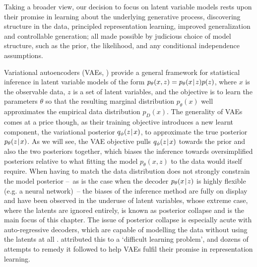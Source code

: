 Taking a broader view, our decision to focus on latent variable models rests upon their promise in learning about the underlying generative process, discovering structure in the data, principled representation learning, improved generalization and controllable generation; all made possible by judicious choice of model structure, such as the prior, the likelihood, and any conditional independence assumptions.

Variational autoencoders (VAEs, \citealp{kingma2013auto,rezende2014stochastic}) provide a general framework for statistical inference in latent variable models of the form $p_\theta(x,z)=p_\theta(x\hspace{0.08em}|\hspace{0.11em} z)p(z)$, where $x$ is the observable data, $z$ is a set of latent variables, and the objective is to learn the parameters $\theta$ so that the resulting marginal distribution $p_\theta(x)$ well approximates the empirical data distribution $p_D(x)$.
The generality of VAEs comes at a price though, as their training objective introduces a new learnt component, the variational posterior $q_\phi(z\hspace{0.08em}|\hspace{0.11em} x)$, to approximate the true posterior $p_\theta(z\hspace{0.08em}|\hspace{0.11em} x)$.
As we will see, the VAE objective pulls $q_\phi(z\hspace{0.08em}|\hspace{0.11em} x)$ towards the prior and also the two posteriors together, which biases the inference towards oversimplified posteriors relative to what fitting the model $p_\theta(x,z)$ to the data would itself require.
When having to match the data distribution does not strongly constrain the model posterior --~as is the case when the decoder $p_\theta(x\hspace{0.08em}|\hspace{0.11em} z)$ is highly flexible (e.g. a neural network)~-- the biases of the inference method are fully on display and have been observed 
in the underuse of latent variables, whose extreme case, where the latents are ignored entirely, is known as posterior collapse \citep{zhao2019infovae} and is the main focus of this chapter.
The issue of posterior collapse is especially acute with auto-regressive decoders, which are capable of modelling the data without using the latents at all \citep{yang2017improved}.
 attributed this to a `difficult learning problem', and dozens of attempts to remedy it followed \citep{alemi2017fixing,dieng2017variational,van2017neural,kim2018semi} to help VAEs fulfil their promise in representation learning.

